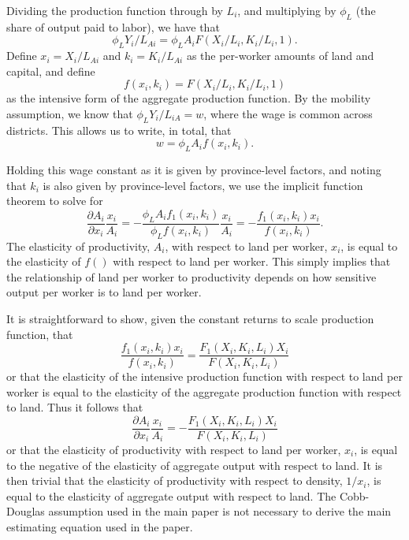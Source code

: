 \documentclass[11pt]{article}
\begin{document}
Dividing the production function through by $L_i$, and multiplying by $\phi_L$ (the share of output paid to labor), we have that
\begin{equation}
    \phi_L Y_i/L_{Ai} = \phi_L A_i F(X_i/L_i,K_i/L_i,1).
\end{equation}
Define $x_i = X_i/L_{Ai}$ and $k_i = K_i/L_{Ai}$ as the per-worker amounts of land and capital, and define
\begin{equation}
    f(x_i,k_i) = F(X_i/L_i,K_i/L_i,1)
\end{equation}
as the intensive form of the aggregate production function. By the mobility assumption, we know that $\phi_L Y_i/L_{iA} = w$, where the wage is common across districts. This allows us to write, in total, that 
\begin{equation}
    w = \phi_L A_i f(x_i,k_i).
\end{equation}

Holding this wage constant as it is given by province-level factors, and noting that $k_i$ is also given by province-level factors, we use the implicit function theorem to solve for
\begin{equation}
    \frac{\partial A_i}{\partial x_i} \frac{x_i}{A_i} = - \frac{\phi_L A_i f_1(x_i,k_i)}{\phi_L f(x_i,k_i)}\frac{x_i}{A_i} = - \frac{f_1(x_i,k_i) x_i}{f(x_i,k_i)}.
\end{equation}
The elasticity of productivity, $A_i$, with respect to land per worker, $x_i$, is equal to the elasticity of $f()$ with respect to land per worker. This simply implies that the relationship of land per worker to productivity depends on how sensitive output per worker is to land per worker. 

It is straightforward to show, given the constant returns to scale production function, that
\begin{equation}
    \frac{f_1(x_i,k_i) x_i}{f(x_i,k_i)} = \frac{F_1(X_i,K_i,L_i) X_i}{F(X_i,K_i,L_i)}
\end{equation}
or that the elasticity of the intensive production function with respect to land per worker is equal to the elasticity of the aggregate production function with respect to land. Thus it follows that 
\begin{equation}
    \frac{\partial A_i}{\partial x_i} \frac{x_i}{A_i} = - \frac{F_1(X_i,K_i,L_i) X_i}{F(X_i,K_i,L_i)}
\end{equation}
or that the elasticity of productivity with respect to land per worker, $x_i$, is equal to the negative of the elasticity of aggregate output with respect to land. It is then trivial that the elasticity of productivity with respect to density, $1/x_i$, is equal to the elasticity of aggregate output with respect to land. The Cobb-Douglas assumption used in the main paper is not necessary to derive the main estimating equation used in the paper.
\end{document}

